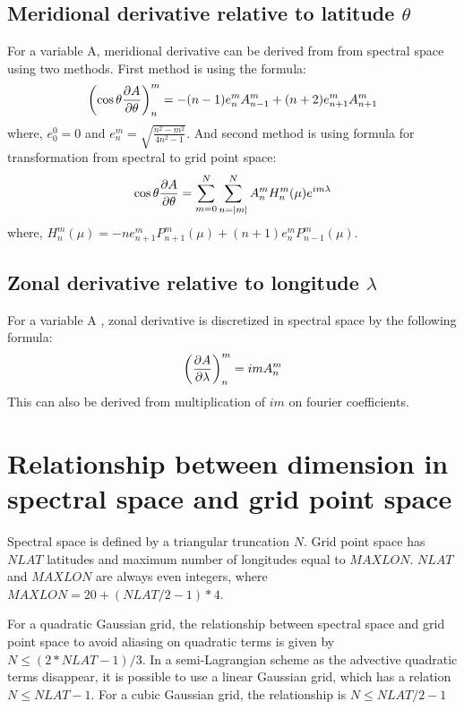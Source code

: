 \documentclass{SBCbookchapter}
\begin{document}
\subsection{Meridional derivative relative to latitude $\theta$ }
For a variable A, meridional derivative can be derived from from spectral space using two methods. First method is using the formula:
\begin{equation}
\left(\cos\theta\pdv{A}{\theta}\right)_{n}^m = -(n-1)e_{n}^m A_{n-1}^m + 
(n+2)e_{n+1}^m A_{n+1}^m
\end{equation}
where, $e_0^0=0$ and $e_n^m = \sqrt{\frac{n^2-m^2}{4n^2-1}}$. And second method is using formula for transformation from spectral to grid point space:
\begin{equation}
\cos\theta\pdv{A}{\theta} = \sum_{m=0}^{N} \sum_{n=|m|}^{N} A_{n}^{m} H_{n}^{m} (\mu) e^{im\lambda}
\end{equation}
where, $H_n^m(\mu) = -ne_{n+1}^m P_{n+1}^m(\mu) + (n+1)e_n^m P_{n-1}^m(\mu)$.

\subsection{Zonal derivative relative to longitude $\lambda$}
For a variable A , zonal derivative is discretized in spectral space by the
following formula:
\begin{equation}
\left(\pdv{A}{\lambda}\right)_n^m = imA_n^m
\end{equation}
This can also be derived from multiplication of $im$ on fourier coefficients.

\section{Relationship between dimension in spectral space and grid point space}
Spectral space is defined by a triangular truncation $N$. Grid point space has $NLAT$ latitudes and maximum number of longitudes equal to $MAXLON$. $NLAT$ and $MAXLON$ are always even integers, where $MAXLON=20+(NLAT/2-1)*4$.

For a quadratic Gaussian grid, the relationship between spectral space and grid point space to avoid aliasing on quadratic terms is given by $N \leq (2*NLAT-1)/3$.
In a semi-Lagrangian scheme as the advective quadratic terms disappear, it is possible to use a linear Gaussian grid, which has a relation $N \leq NLAT-1$.
For a cubic Gaussian grid, the relationship is $N \leq NLAT/2 -1 $
\end{document}
